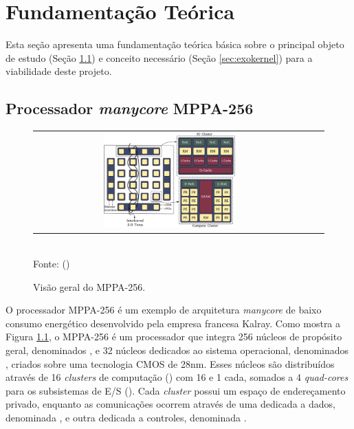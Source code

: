 \documentclass[
	12pt,				%
	openright,			%
	twoside,			%
	a4paper,			%
	english,			%
	brazil,				%
	]{abntex2}
\begin{document}
\chapter{Fundamentação Teórica}
\label{sec:fundamentacao}

    Esta seção apresenta uma fundamentação teórica básica sobre o
    principal objeto de estudo (Seção \ref{sec:mppa}) e conceito necessário
    (Seção \ref{sec:exokernel}) para a viabilidade deste projeto.

    \section{Processador \textit{manycore} MPPA-256}
    \label{sec:mppa}
    
        \begin{figure}[t]
            \begin{center}
                \caption{Visão geral do MPPA-256.}
                    \label{figmppa}
                \begin{tabular}{ccc}
                    \includegraphics[width=0.5\textwidth]{figs/mppa-overview.pdf}\\
                \end{tabular}
                \vspace{1ex} \\
                Fonte: ()
            \end{center}
            \vspace{-2ex}
        \end{figure}
    
        O processador MPPA-256 é um exemplo de arquitetura \textit{manycore}
        de baixo consumo energético \cite{Castro-IA3:2013} desenvolvido pela
        empresa francesa Kalray. Como mostra a Figura \ref{figmppa}, o MPPA-256
        é um processador que integra 256 núcleos de propósito geral,
        denominados \pes, e 32 núcleos dedicados ao sistema operacional,
        denominados \rmans, criados sobre uma tecnologia CMOS de 28nm.
        Esses núcleos são distribuídos através de 16 \textit{clusters} de
        computação (\cpclusters) com 16 \pes e 1 \rman cada, somados a 
        4 \textit{quad-cores} para os subsistemas de E/S (\ioclusters).
        Cada \textit{cluster} possui um espaço de endereçamento privado,
        enquanto as comunicações ocorrem através de uma \noc dedicada a
        dados, denominada \dnoc, e outra dedicada a controles, denominada \cnoc.
            
\end{document}
